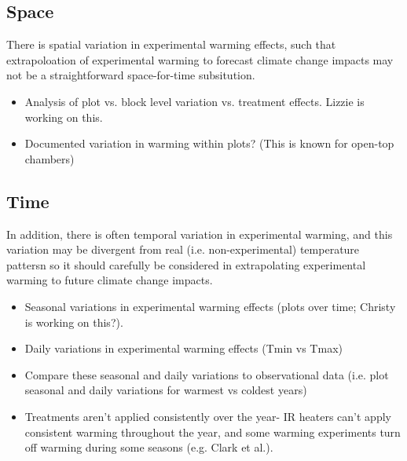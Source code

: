 \documentclass{article}
\begin{document}
\subsection {Space}
There is spatial variation in experimental warming effects, such that extrapoloation of experimental warming to forecast climate change impacts may not be a straightforward space-for-time subsitution.
\begin{itemize}
\item Analysis of plot vs. block level variation vs. treatment effects. Lizzie is working on this.
\item Documented variation in warming within plots? (This is known for open-top chambers)
\end{itemize}
\subsection {Time}
In addition, there is often temporal variation in experimental warming, and this variation may be divergent from real (i.e. non-experimental) temperature pattersn so it should carefully be considered in extrapolating experimental warming to future climate change impacts.
\begin{itemize}
\item Seasonal variations in experimental warming effects (plots over time; Christy is working on this?).
\item Daily variations in experimental warming effects (Tmin vs Tmax)
\item Compare these seasonal and daily variations to observational data (i.e. plot seasonal and daily variations for warmest vs coldest years)
\item Treatments aren’t applied consistently over the year- IR heaters can't
apply consistent warming throughout the year, and some warming experiments turn off warming during some seasons (e.g. Clark et al.).
\end{itemize}
\end{document}
